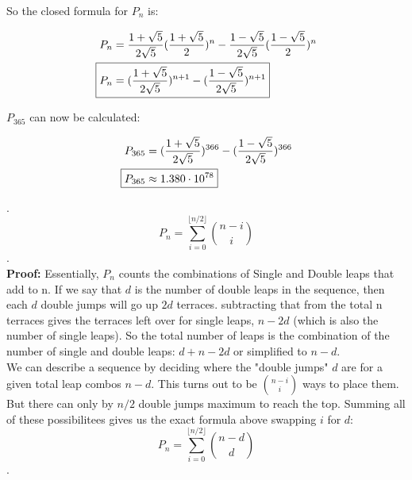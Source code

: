 \documentclass[10pt, AMS Euler]{article}
\begin{document}
    \noindent So the closed formula for $P_n$ is:

    \begin{align*}
        P_n &= \frac{1+\sqrt{5}}{2\sqrt{5}} (\frac{1+\sqrt{5}}{2} )^{n} - \frac{1-\sqrt{5}}{2\sqrt{5}} (\frac{1-\sqrt{5}}{2} )^{n} \\
        \Aboxed{P_n &= (\frac{1+\sqrt{5}}{2\sqrt{5}} )^{n+1} -  (\frac{1-\sqrt{5}}{2\sqrt{5}} )^{n+1}}
    \end{align*}
	
	\vspace{1em}

    \noindent $P_{365}$ can now be calculated:

    \begin{align*}
        P_{365} &= (\frac{1+\sqrt{5}}{2\sqrt{5}} )^{366} -  (\frac{1-\sqrt{5}}{2\sqrt{5}} )^{366} \\
        \Aboxed{P_{365} &\approx 1.380 \cdot 10^{78}}
    \end{align*}

    \vspace{1em}
    
    . 
    $$P_n = \sum_{i=0}^{\lfloor n/2 \rfloor}\binom{n-i}{i}$$. \\
    \textbf{Proof:} Essentially, $P_n$ counts the combinations of Single and Double leaps that add to n. If we say that $d$ is the number of double leaps in the sequence, then each $d$ double jumps will go up $2d$ terraces. subtracting that from the total n terraces gives the terraces left over for single leaps, $n - 2d$ (which is also the number of single leaps).
    So the total number of leaps is the combination of the number of single and double leaps:  $d+n-2d$ or simplified to $n-d$.\\ 

    We can describe a sequence by deciding where the "double jumps" $d$ are for a given  total leap combos $n-d$. This turns out to be $\binom{n-i}{i}$ ways to place them. But there can only by $n/2$ double jumps maximum to reach the top. Summing all of these possibilitees gives us the exact formula above swapping $i$ for $d$: \\ 
    $$P_n = \sum_{i=0}^{\lfloor n/2 \rfloor}\binom{n-d}{d}$$.
	
	\vspace{2em}
	\noindent \underline{\hspace{5in}}
	
	
	\vspace{2em}
	
\end{document}
